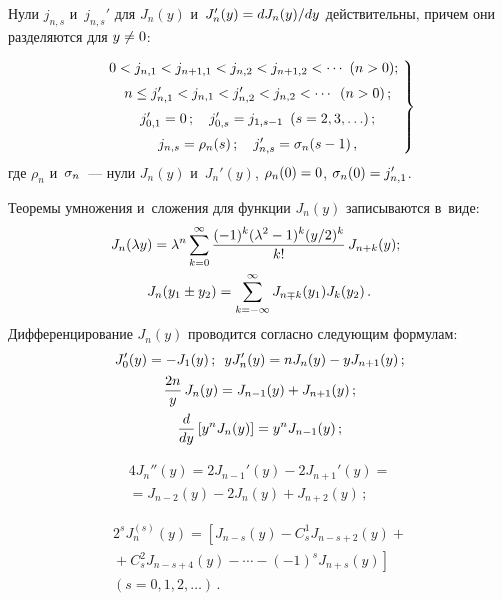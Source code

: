 \begin{multicols}{2}
Нули $j_{n,s}$ и~$j_{n,s}'$ для  $J_n (y)$  и~$J_n'(y)\hm=dJ_n(y)/dy$ действительны, 
причем они разделяются для $y\hm\ne 0$:

\noindent
\begin{equation}
\left.
\begin{array}{c}
    \hspace*{-2mm}0<j_{n,1} <j_{n+1,1} < j_{n,2} < j_{n+1, 2} < \cdots \ (n>0);\\[6pt]
    n\le j_{n,1}' <  j_{n,1}<  j_{n,2}' <  j_{n,2}< \cdots \enskip (n>0)\,;\\[6pt]
    j_{0,1}' =0\,;\quad  j_{0,s}' =  j_{1,s-1} \enskip ( s=2,3,\ldots)\,;\\[6pt]
    j_{n,s} =\rho_n(s)\,;\quad j_{n,s}' = \si_n (s-1)\,,
    \end{array}\!
    \right\}\!\!
    \label{e7-sin}
    \end{equation}
где $\rho_n$ и~$\sigma_n$~--- нули $J_n(y)$ и~$J_n'(y)$, 
$\rho_n (0)\hm=0$, $\si_n (0) \hm= j_{n,1}'$.

Теоремы умножения и~сложения для функции $J_n(y)$ записываются в~виде:
\begin{gather}
\hspace*{-3mm}J_n(\la y) = \la^n \sss_{k=0}^\infty \fr{(-1)^k (\la^2 -1)^k (y/2)^k}{k!}\,
 J_{n+k} (y);\!\!\label{e8-sin}\\
J_n (y_1\pm y_2) =\sss_{k=-\infty}^\infty J_{n\mp k} (y_1) J_k (y_2)\,.\notag %
\end{gather}
Дифференцирование $J_n(y)$ проводится согласно следующим формулам:
    \begin{gather*}
    J_0' (y) =-J_1 (y)\,;\enskip 
    yJ_n' (y) = n J_n(y) - y J_{n+1} (y)\,;\\ 
    \displaystyle\frac{\displaystyle 2n\mathstrut}{\displaystyle y\mathstrut}\, J_n (y) = J_{n-1} (y) + J_{n+1} (y)\,;\\
    \displaystyle\frac{\displaystyle d\mathstrut}{\displaystyle dy\mathstrut} \left[ y^n J_n (y)\right] = y^n J_{n-1} (y)\,;
\end{gather*}

\vspace*{-12pt}

\noindent
    \begin{multline*}
4J_n'' (y) = 2 J_{n-1}' (y) - 2 J_{n+1}' (y) = {}\\
{}=J_{n-2} (y) - 2 J_n (y) + J_{n+2} (y)\,;
\end{multline*}

\vspace*{-12pt}

\noindent
\begin{multline*}
2^s J_n^{(s)} (y) = \left[ J_{n-s} (y) - C_s^1 J_{n-s+2} (y) + {}\right.\\
\left.{}+C_s^2 J_{n-s+4} (y) 
-\cdots - (-1)^s J_{n+s} (y)\right] \\ 
(s=0,1,2,\ldots)\,. %
\end{multline*}


\end{multicols}
